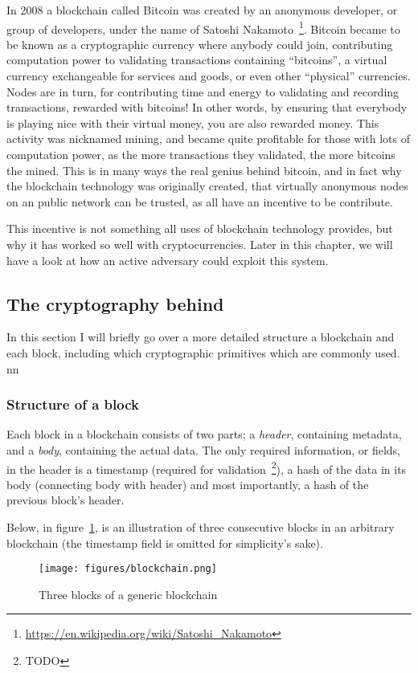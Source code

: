 In 2008 a blockchain called Bitcoin was created by an anonymous
developer, or group of developers, under the name of Satoshi
Nakamoto~\footnote{\url{https://en.wikipedia.org/wiki/Satoshi_Nakamoto}}.
Bitcoin became to be known as a cryptographic currency where anybody
could join, contributing computation power to validating transactions
containing ``bitcoins'', a virtual currency exchangeable for services
and goods, or even other ``physical'' currencies. Nodes are in turn,
for contributing time and energy to validating and recording
transactions, rewarded with bitcoins! In other words, by ensuring that
everybody is playing nice with their virtual money, you are also
rewarded money. This activity was nicknamed mining, and became quite
profitable for those with lots of computation power, as the more
transactions they validated, the more bitcoins the mined. This is in
many ways the real genius behind bitcoin, and in fact why the
blockchain technology was originally created, that virtually anonymous
nodes on an public network can be trusted, as all have an incentive to
be contribute.

This incentive is not something all uses of blockchain technology
provides, but why it has worked so well with cryptocurrencies. Later
in this chapter, we will have a look at how an active adversary could
exploit this system.


\subsection{The cryptography behind}
In this section I will briefly go over a more detailed structure a
blockchain and each block, including which cryptographic primitives
which are commonly used.
nn
\subsubsection{Structure of a block}
Each block in a blockchain consists of two parts; a \textit{header},
containing metadata, and a \textit{body}, containing the actual data.
The only required information, or fields, in the header is a
timestamp (required for validation~\footnote{TODO}), a hash of the data in
its body (connecting body with header) and most importantly, a hash of
the previous block's header.

Below, in figure~\ref{fig:blockchain}, is an illustration of three
consecutive blocks in an arbitrary blockchain (the timestamp field is
omitted for simplicity's sake).
\begin{figure}[H]
  \centering
  \texttt{[image: figures/blockchain.png]}
  \caption{\label{fig:blockchain} Three blocks of a generic blockchain}
\end{figure}

